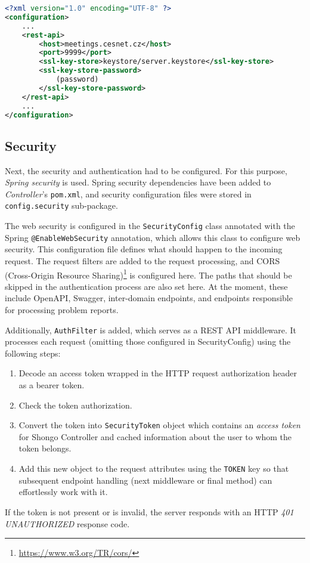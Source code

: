 \begin{lstlisting}[language=XML, caption=REST configuration example, label=conf]
<?xml version="1.0" encoding="UTF-8" ?>
<configuration>
    ...
    <rest-api>
        <host>meetings.cesnet.cz</host>
        <port>9999</port>
        <ssl-key-store>keystore/server.keystore</ssl-key-store>
        <ssl-key-store-password>
            (password)
        </ssl-key-store-password>
    </rest-api>
    ...
</configuration>
\end{lstlisting}

\subsection{Security}
Next, the security and authentication had to be configured. For this purpose, \emph{Spring security} is used. Spring security dependencies have been added to \emph{Controller}'s \texttt{pom.xml}, and security configuration files were stored in \texttt{config.security} sub-package.

The web security is configured in the \texttt{SecurityConfig} class annotated with the Spring \texttt{@EnableWebSecurity} annotation, which allows this class to configure web security\cite{springdocumentation}.
This configuration file defines what should happen to the incoming request. The request filters are added to the request processing, and CORS (Cross-Origin Resource Sharing)\footnote{\url{https://www.w3.org/TR/cors/}} is configured here. The paths that should be skipped in the authentication process are also set here. At the moment, these include OpenAPI, Swagger, inter-domain endpoints\cite{pavelka2016shongo}, and endpoints responsible for processing problem reports.

Additionally, \texttt{AuthFilter} is added, which serves as a REST API middleware. It processes each request (omitting those configured in SecurityConfig) using the following steps:
\begin{enumerate}
    \item Decode an access token wrapped in the HTTP request authorization header as a bearer token.
    \item Check the token authorization.
    \item Convert the token into \texttt{SecurityToken} object which contains an \emph{access token} for Shongo Controller and cached information about the user to whom the token belongs.
    \item Add this new object to the request attributes using the \texttt{TOKEN} key so that subsequent endpoint handling (next middleware or final method) can effortlessly work with it.
\end{enumerate}
If the token is not present or is invalid, the server responds with an HTTP \emph{401 UNAUTHORIZED} response code.

